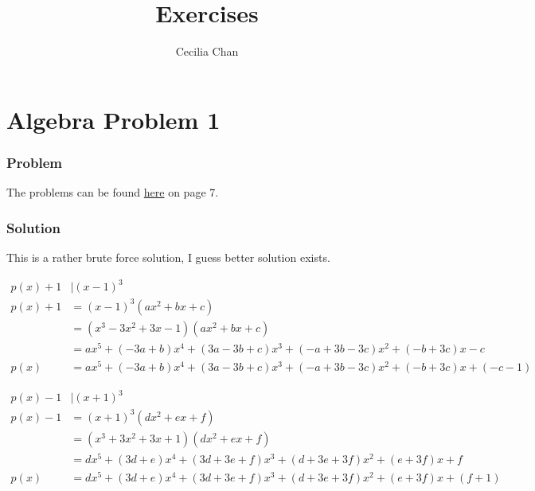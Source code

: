 \documentclass{article}
\title{Exercises}
\author{Cecilia Chan}
\begin{document}
\maketitle

\section*{Algebra Problem 1}
\subsubsection*{Problem}
The problems can be found \href{https://www.math.hkust.edu.hk/~makyli/190_2010Sp/problemBk.pdf}{here} on page 7.

\subsubsection*{Solution}
This is a rather brute force solution, I guess better solution exists.

\begin{align*}
  p(x) + 1 &| (x - 1)^3                                                                           \\
  p(x) + 1 &= (x - 1)^3(ax^2 + bx + c)                                                            \\
           &= (x^3 - 3x^2 + 3x - 1)(ax^2 + bx + c)                                                \\
           &= ax^5 + (-3a + b)x^4 + (3a - 3b + c)x^3 + (-a + 3b - 3c)x^2 + (-b + 3c)x - c        \\
      p(x) &= ax^5 + (-3a + b)x^4 + (3a - 3b + c)x^3 + (-a + 3b - 3c)x^2 + (-b + 3c)x + (-c - 1)
\end{align*}

\begin{align*}
  p(x) - 1 &| (x + 1)^3                                                                       \\
  p(x) - 1 &= (x + 1)^3(dx^2 + ex + f)                                                        \\
           &= (x^3 + 3x^2 + 3x + 1)(dx^2 + ex + f)                                            \\
           &= dx^5 + (3d + e)x^4 + (3d + 3e + f)x^3 + (d + 3e + 3f)x^2 + (e + 3f)x + f       \\
      p(x) &= dx^5 + (3d + e)x^4 + (3d + 3e + f)x^3 + (d + 3e + 3f)x^2 + (e + 3f)x + (f + 1) \\
\end{align*}
\end{document}
